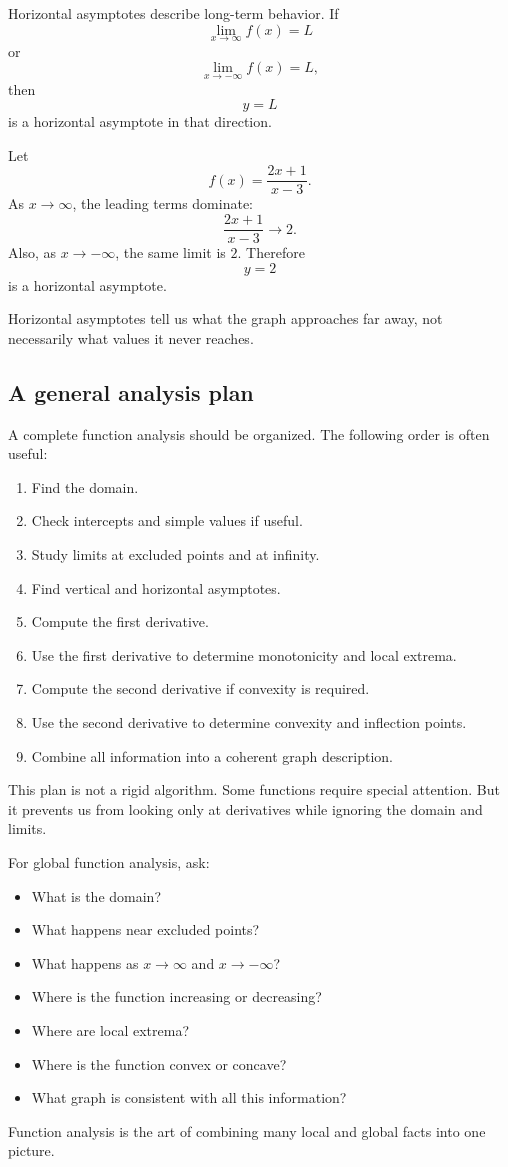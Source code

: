 Horizontal asymptotes describe long-term behavior. If
\[
\lim_{x\to\infty}f(x)=L
\]
or
\[
\lim_{x\to-\infty}f(x)=L,
\]
then
\[
y=L
\]
is a horizontal asymptote in that direction.

\begin{examplebox}
Let
\[
f(x)=\frac{2x+1}{x-3}.
\]
As \(x\to\infty\), the leading terms dominate:
\[
\frac{2x+1}{x-3}\to2.
\]
Also, as \(x\to-\infty\), the same limit is \(2\). Therefore
\[
y=2
\]
is a horizontal asymptote.
\end{examplebox}

Horizontal asymptotes tell us what the graph approaches far away, not necessarily what values it never reaches.

\subsection*{A general analysis plan}

A complete function analysis should be organized. The following order is often useful:

\begin{enumerate}
\item Find the domain.
\item Check intercepts and simple values if useful.
\item Study limits at excluded points and at infinity.
\item Find vertical and horizontal asymptotes.
\item Compute the first derivative.
\item Use the first derivative to determine monotonicity and local extrema.
\item Compute the second derivative if convexity is required.
\item Use the second derivative to determine convexity and inflection points.
\item Combine all information into a coherent graph description.
\end{enumerate}

This plan is not a rigid algorithm. Some functions require special attention. But it prevents us from looking only at derivatives while ignoring the domain and limits.

\begin{summarybox}
For global function analysis, ask:
\begin{itemize}
\item What is the domain?
\item What happens near excluded points?
\item What happens as \(x\to\infty\) and \(x\to-\infty\)?
\item Where is the function increasing or decreasing?
\item Where are local extrema?
\item Where is the function convex or concave?
\item What graph is consistent with all this information?
\end{itemize}
\end{summarybox}

Function analysis is the art of combining many local and global facts into one picture.